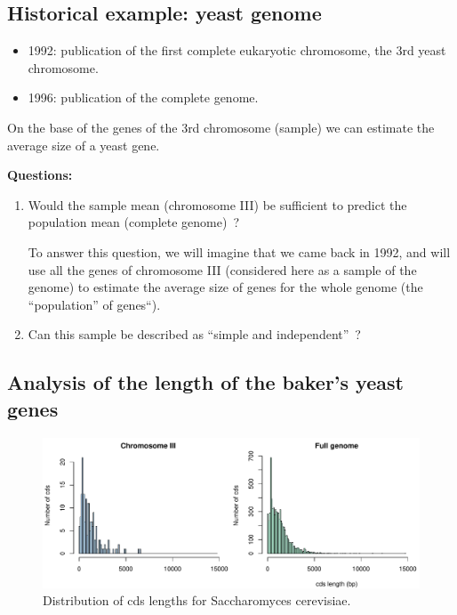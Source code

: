 \documentclass[]{article}
\providecommand{\tightlist}{%
  \setlength{\itemsep}{0pt}\setlength{\parskip}{0pt}}
\begin{document}
\subsection{Historical example: yeast
genome}\label{historical-example-yeast-genome}

\begin{itemize}
\tightlist
\item
  1992: publication of the first complete eukaryotic chromosome, the 3rd
  yeast chromosome.
\item
  1996: publication of the complete genome.
\end{itemize}

On the base of the genes of the 3rd chromosome (sample) we can estimate
the average size of a yeast gene.

\textbf{Questions: }

\begin{enumerate}
\def\labelenumi{(\alph{enumi})}
\item
  Would the sample mean (chromosome III) be sufficient to predict the
  population mean (complete genome)~?

  To answer this question, we will imagine that we came back in 1992,
  and will use all the genes of chromosome III (considered here as a
  sample of the genome) to estimate the average size of genes for the
  whole genome (the ``population'' of genes``).
\item
  Can this sample be described as ``simple and independent''~?
\end{enumerate}

\subsection{Analysis of the length of the baker's yeast
genes}\label{analysis-of-the-length-of-the-bakers-yeast-genes}

\begin{figure}

{\centering \includegraphics[width=0.9\linewidth]{figures/cds_length_histo-1} 

}

\caption{Distribution of cds lengths for Saccharomyces cerevisiae. }\label{fig:cds_length_histo}
\end{figure}
\end{document}
